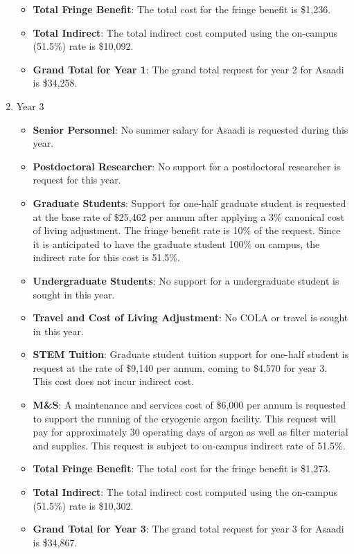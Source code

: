 \begin{enumerate}
\begin{itemize}[noitemsep,nolistsep]
\item {{\bf Total Fringe Benefit}: The total cost for the fringe benefit is \$1,236.}

\item {{\bf Total Indirect}: The total indirect cost computed using the on-campus (51.5\%) rate is \$10,092.}

\item {{\bf Grand Total for Year 1}: The grand total request for year 2 for Asaadi is \$34,258.}

\end{itemize}

\item{Year 3}
\begin{itemize}[noitemsep,nolistsep]
\item{{\bf Senior Personnel}: No summer salary for Asaadi is requested during this year.}

\item {{\bf Postdoctoral Researcher}:  No support for a postdoctoral researcher is request for this year.} 

\item{{\bf Graduate Students}: Support for one-half graduate student is requested at the base rate of \$25,462 per annum after applying a 3\% canonical cost of living adjustment.   The fringe benefit rate is 10\% of the request.  Since it is anticipated to have the graduate student 100\% on campus, the indirect rate for this cost is 51.5\%.}

\item {{\bf Undergraduate Students}: No support for a undergraduate student is sought in this year.}

\item{{\bf Travel and Cost of Living Adjustment}: No COLA or travel is sought in this year.}

\item {{\bf STEM Tuition}: Graduate student tuition support for one-half student is request at the rate of \$9,140 per annum, coming to \$4,570 for year 3.  This cost does not incur indirect cost.}

\item {{\bf M\&S}: A maintenance and services cost of \$6,000 per annum is requested to support the running of the cryogenic argon facility. This request will pay for approximately 30 operating days of argon as well as filter material and supplies.    This request is subject to on-campus indirect rate of 51.5\%.}

\item {{\bf Total Fringe Benefit}: The total cost for the fringe benefit is \$1,273.}
\item {{\bf Total Indirect}: The total indirect cost computed using the on-campus (51.5\%) rate is \$10,302.}
\item {{\bf Grand Total for Year 3}: The grand total request for year 3 for Asaadi is \$34,867.}

\end{itemize}
\end{enumerate}

